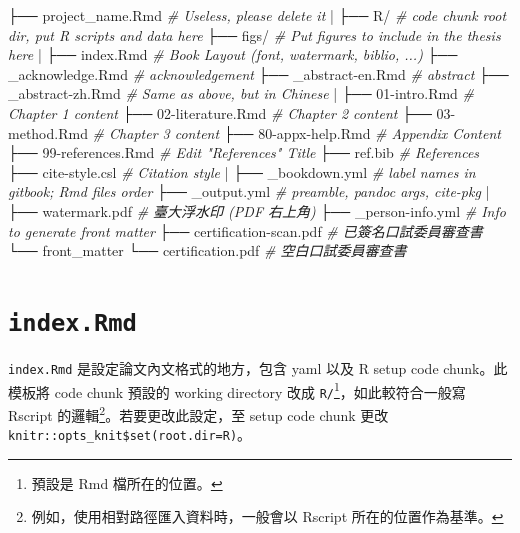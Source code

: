\documentclass[]{book}
\newenvironment{Shaded}{}{}
\newcommand{\AttributeTok}[1]{\textcolor[rgb]{0.49,0.56,0.16}{#1}}
\newcommand{\CharTok}[1]{\textcolor[rgb]{0.25,0.44,0.63}{#1}}
\newcommand{\CommentTok}[1]{\textcolor[rgb]{0.38,0.63,0.69}{\textit{#1}}}
\begin{document}
\begin{Shaded}
\begin{Highlighting}[]
\AttributeTok{├── project\_name.Rmd}\CommentTok{     \# Useless, please delete it}
\CharTok{|}
\AttributeTok{├── R/}\CommentTok{                   \# code chunk root dir, put R scripts and data here}
\AttributeTok{├── figs/}\CommentTok{                \# Put figures to include in the thesis here}
\CharTok{|}
\AttributeTok{├── index.Rmd}\CommentTok{            \# Book Layout (font, watermark, biblio, ...)}
\AttributeTok{├── \_acknowledge.Rmd}\CommentTok{     \# acknowledgement}
\AttributeTok{├── \_abstract{-}en.Rmd}\CommentTok{     \# abstract}
\AttributeTok{├── \_abstract{-}zh.Rmd}\CommentTok{     \# Same as above, but in Chinese}
\CharTok{|}
\AttributeTok{├── 01{-}intro.Rmd}\CommentTok{         \# Chapter 1 content}
\AttributeTok{├── 02{-}literature.Rmd}\CommentTok{    \# Chapter 2 content}
\AttributeTok{├── 03{-}method.Rmd}\CommentTok{        \# Chapter 3 content}
\AttributeTok{├── 80{-}appx{-}help.Rmd}\CommentTok{     \# Appendix Content}
\AttributeTok{├── 99{-}references.Rmd}\CommentTok{    \# Edit "References" Title}
\AttributeTok{├── ref.bib}\CommentTok{              \# References}
\AttributeTok{├── cite{-}style.csl}\CommentTok{       \# Citation style}
\CharTok{|}
\AttributeTok{├── \_bookdown.yml}\CommentTok{        \# label names in gitbook; Rmd files order}
\AttributeTok{├── \_output.yml}\CommentTok{          \# preamble, pandoc args, cite{-}pkg}
\CharTok{|}
\AttributeTok{├── watermark.pdf}\CommentTok{        \# 臺大浮水印 (PDF 右上角)}
\AttributeTok{├── \_person{-}info.yml}\CommentTok{      \# Info to generate front matter}
\AttributeTok{├── certification{-}scan.pdf}\CommentTok{  \# 已簽名\textquotesingle{}口試委員審查書\textquotesingle{}}
\AttributeTok{└── front\_matter}
\AttributeTok{    └── certification.pdf}\CommentTok{   \# 空白\textquotesingle{}口試委員審查書\textquotesingle{}}
\end{Highlighting}
\end{Shaded}

\hypertarget{index-rmd}{%
\section{\texorpdfstring{\texttt{index.Rmd}}{index.Rmd}}\label{index-rmd}}

\texttt{index.Rmd} 是設定論文內文格式的地方，包含 yaml 以及 R setup code
chunk。此模板將 code chunk 預設的 working directory 改成
\texttt{R/}\footnote{預設是 Rmd 檔所在的位置。}，如此較符合一般寫
Rscript 的邏輯\footnote{例如，使用相對路徑匯入資料時，一般會以 Rscript
  所在的位置作為基準。}。若要更改此設定，至 setup code chunk 更改
\texttt{knitr::opts\_knit\$set(root.dir=\textquotesingle{}R\textquotesingle{})}。
\end{document}
